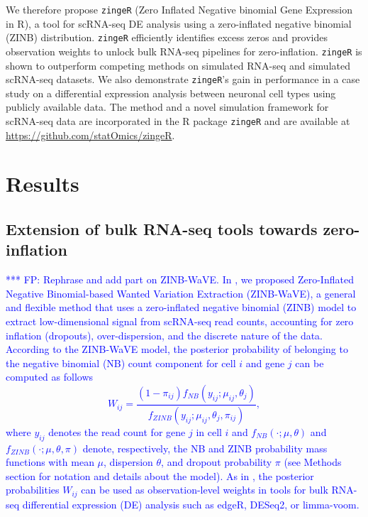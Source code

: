 \documentclass{bmcart}
\newcommand{\fanny}[1]{\textcolor{blue}{*** FP: #1}}
\begin{document}
We therefore propose \texttt{zingeR} (Zero Inflated Negative binomial Gene Expression in R), a tool for scRNA-seq DE analysis using a zero-inflated negative binomial (ZINB) distribution.
\texttt{zingeR} efficiently identifies excess zeros and provides observation weights to unlock bulk RNA-seq pipelines for zero-inflation.
\texttt{zingeR} is shown to outperform competing methods on simulated RNA-seq and simulated scRNA-seq datasets. 
We also demonstrate \texttt{zingeR}'s gain in performance in a case study on a differential expression analysis between neuronal cell types using publicly available data.
The method and  a novel simulation framework for scRNA-seq data are incorporated in the R package \texttt{zingeR} and are available at \url{https://github.com/statOmics/zingeR}.


\section*{Results}

\subsection*{Extension of bulk RNA-seq tools towards zero-inflation}

\fanny{Rephrase and add part on ZINB-WaVE. In \cite{Risso2017}, we proposed Zero-Inflated Negative Binomial-based Wanted Variation Extraction (ZINB-WaVE), a general and flexible method that uses a zero-inflated negative binomial (ZINB) model to extract low-dimensional signal from scRNA-seq read counts, accounting for zero inflation (dropouts), over-dispersion, and the discrete nature of the data. According to the ZINB-WaVE model, the posterior probability of belonging to the negative binomial (NB) count component for cell $i$ and gene $j$ can be computed as follows
\begin{equation}W_{ij} = \frac{ ( 1 - \pi_{ij} ) f_{NB}(y_{ij}; \mu_{ij}, \theta_j ) }{f_{ZINB}(y_{ij};\mu_{ij}, \theta_j, \pi_{ij})},
\end{equation}
where $y_{ij}$ denotes the read count for gene $j$ in cell $i$ and $f_{NB}(\cdot; \mu, \theta)$ and $f_{ZINB}(\cdot; \mu, \theta, \pi)$ denote, respectively, the NB and ZINB probability mass functions with mean $\mu$, dispersion $\theta$, and dropout probability $\pi$ (see Methods section for notation and details about the model). As in \cite{VandenBerge2017ZingeR:Applications}, the posterior probabilities $W_{ij}$ can be used as observation-level weights in tools for bulk RNA-seq differential expression (DE) analysis such as edgeR, DESeq2, or limma-voom.}
\end{document}
